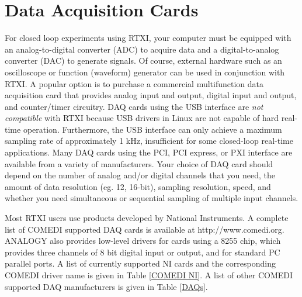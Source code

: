 
\section{Data Acquisition Cards}
\label{dataacquisition}

For closed loop experiments using RTXI, your computer must be equipped with an analog-to-digital converter (ADC) to acquire data and a digital-to-analog converter (DAC) to generate signals. Of course, external hardware such as an oscilloscope or function (waveform) generator can be used in conjunction with RTXI. A popular option is to purchase a commercial multifunction data acquisition card that provides analog input and output, digital input and output, and counter/timer circuitry. DAQ cards using the USB interface are \attention \emph{not compatible} with RTXI because USB drivers in Linux are not capable of hard real-time operation. Furthermore, the USB interface can only achieve a maximum sampling rate of approximately 1 kHz, insufficient for some closed-loop real-time applications. Many DAQ cards using the PCI, PCI express, or PXI interface are available from a variety of manufacturers. Your choice of DAQ card should depend on the number of analog and/or digital channels that you need, the amount of data resolution (eg. 12, 16-bit), sampling resolution, speed, and whether you need simultaneous or sequential sampling of multiple input channels. 

Most RTXI users use products developed by National Instruments. \attention A complete list of COMEDI supported DAQ cards is available at http://www.comedi.org. ANALOGY also provides low-level drivers for cards using a 8255 chip, which provides three channels of 8 bit digital input or output, and for standard PC parallel ports. A list of currently supported NI cards and the corresponding COMEDI driver name is given in Table \ref{COMEDI NI}. A list of other COMEDI supported DAQ manufacturers is given in Table \ref{DAQs}.

